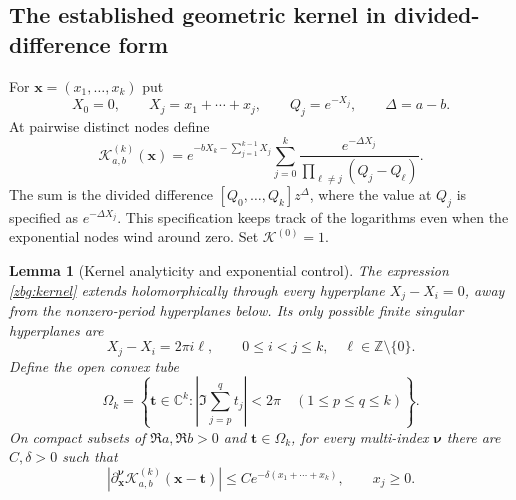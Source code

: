 \documentclass[11pt,letterpaper]{article}
\numberwithin{equation}{section}
\theoremstyle{plain}
\newtheorem{lemma}[theorem]{Lemma}
\theoremstyle{definition}
\theoremstyle{remark}
\begin{document}
\subsection{The established geometric kernel in divided-difference form}

For $\boldsymbol x=(x_1,\ldots,x_k)$ put
\[
 X_0=0,\qquad X_j=x_1+\cdots+x_j,\qquad Q_j=e^{-X_j},\qquad
 \Delta=a-b.
\]
At pairwise distinct nodes define
\begin{equation}\label{zbg:kernel}
 \mathscr K_{a,b}^{(k)}(\boldsymbol x)
 =e^{-bX_k-\sum_{j=1}^{k-1}X_j}
       \sum_{j=0}^k
       \frac{e^{-\Delta X_j}}{\prod_{\ell\ne j}(Q_j-Q_\ell)}.
\end{equation}
The sum is the divided difference
$[Q_0,\ldots,Q_k]z^\Delta$, where the value at $Q_j$ is specified
as $e^{-\Delta X_j}$.  This specification keeps track of the
logarithms even when the exponential nodes wind around zero.  Set
$\mathscr K^{(0)}=1$.

\begin{lemma}[Kernel analyticity and exponential control]\label{zbg:bounds}
The expression \eqref{zbg:kernel} extends holomorphically through
every hyperplane $X_j-X_i=0$, away from the nonzero-period
hyperplanes below. Its only possible finite singular
hyperplanes are
\[
 X_j-X_i=2\pi i\ell,\qquad 0\leq i<j\leq k,
                   \quad \ell\in\mathbb Z\setminus\{0\}.
\]
Define the open convex tube
\begin{equation}\label{zbg:tube}
 \Omega_k=\left\{\boldsymbol t\in\mathbb C^k:
   \left|\Im\sum_{j=p}^q t_j\right|<2\pi
                      \quad(1\leq p\leq q\leq k)\right\}.
\end{equation}
On compact subsets of $\Re a,\Re b>0$ and
$\boldsymbol t\in\Omega_k$, for every multi-index $\boldsymbol\nu$
there are $C,\delta>0$ such that
\begin{equation}\label{zbg:bound}
 \left|\partial_{\boldsymbol x}^{\boldsymbol\nu}
       \mathscr K_{a,b}^{(k)}(\boldsymbol x-\boldsymbol t)\right|
       \leq C e^{-\delta(x_1+\cdots+x_k)},\qquad x_j\geq0.
\end{equation}
\end{lemma}
\end{document}
